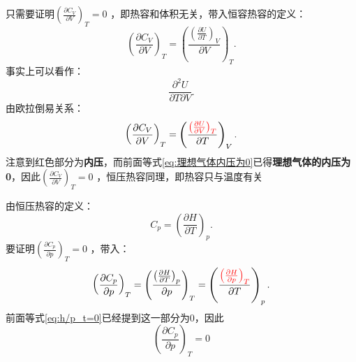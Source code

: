只需要证明$\left(\frac{\partial C_{V}}{\partial V}\right)_{T}=0$ ，即热容和体积无关，带入恒容热容的定义：
\[
    \left(\frac{\partial C_{V}}{\partial V}\right)_{T} = \left(\frac{\left(\frac{\partial U}{\partial T}\right)_{V}}{\partial V}\right)_{T}
.\]
事实上可以看作：\[
    \frac{\partial^2 U}{\partial T\partial V}
.\]
由欧拉倒易关系：\[
    \left(\frac{\partial C_{V}}{\partial V}\right)_{T} = \left(\frac{\textcolor{red}{\left(\frac{\partial U}{\partial V}\right)_{T}}}{\partial T}\right)_{V}
.\]
注意到红色部分为\textbf{内压}，而前面等式\ref{eq:理想气体内压为0}已得\textbf{理想气体的内压为0}，因此$\left(\frac{\partial C_{V}}{\partial V}\right)_{T}=0$ ，恒压热容同理，即热容只与温度有关
\begin{sol}
    由恒压热容的定义：\[
        C_{p} = \left(\frac{\partial H}{\partial T}\right)_{p}
    .\]
    要证明$\left(\frac{\partial C_{p}}{\partial p}\right)_{T}=0$ ，带入：\[
        \left(\frac{\partial C_{p}}{\partial p}\right)_{T} = \left(\frac{\left(\frac{\partial H}{\partial T}\right)_{p}}{\partial p}\right)_{T} = \left(\frac{\textcolor{red}{\left(\frac{\partial H}{\partial p}\right)_{T}}}{\partial T}\right)_{p}
    .\]
    前面等式\ref{eq:h/p_t=0}已经提到这一部分为0，因此
    \begin{equation}
        \left(\frac{\partial C_{p}}{\partial p}\right)_{T}=0
    \end{equation}
\end{sol}
